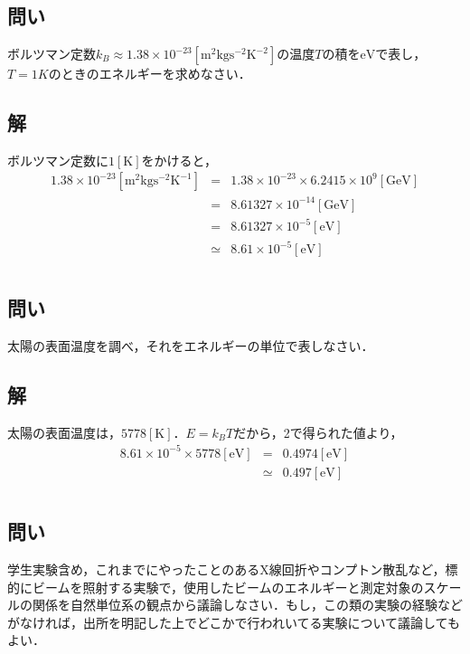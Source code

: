 \documentclass[10pt]{ujarticle}
\begin{document}
\section{}
\subsection{問い}
ボルツマン定数$k_B \approx 1.38 \times 10^{-23} \mathrm{[m^2 kg s^{-2} K^{-2}]}$の温度$T$の積を$\mathrm{eV}$で表し，$T=1K$のときのエネルギーを求めなさい．

\subsection{解}
ボルツマン定数に$1\mathrm{[K]}$をかけると，
\begin{eqnarray*}
1.38 \times 10^{-23} \mathrm{[m^2 kg s^{-2} K^{-1}]} &=& 1.38 \times 10^{-23} \times 6.2415 \times 10^9 \mathrm{[GeV]}\\
&=& 8.61327 \times 10^{-14} \mathrm{[GeV]} \\
&=& 8.61327 \times 10^{-5} \mathrm{[eV]}\\
&\simeq& 8.61 \times 10^{-5} \mathrm{[eV]}
\end{eqnarray*}


\section{}
\subsection{問い}
太陽の表面温度を調べ，それをエネルギーの単位で表しなさい．

\subsection{解}
太陽の表面温度は，$5778\mathrm{[K]}$．$E = k_B T$だから，2で得られた値より，
\begin{eqnarray*}
8.61 \times 10^{-5} \times 5778 \mathrm{[eV]} &=& 0.4974 \mathrm{[eV]} \\
&\simeq& 0.497 \mathrm{[eV]}
\end{eqnarray*}

\section{}
\subsection{問い}
学生実験含め，これまでにやったことのあるX線回折やコンプトン散乱など，標的にビームを照射する実験で，使用したビームのエネルギーと測定対象のスケールの関係を自然単位系の観点から議論しなさい．もし，この類の実験の経験などがなければ，出所を明記した上でどこかで行われいてる実験について議論してもよい．
\end{document}
